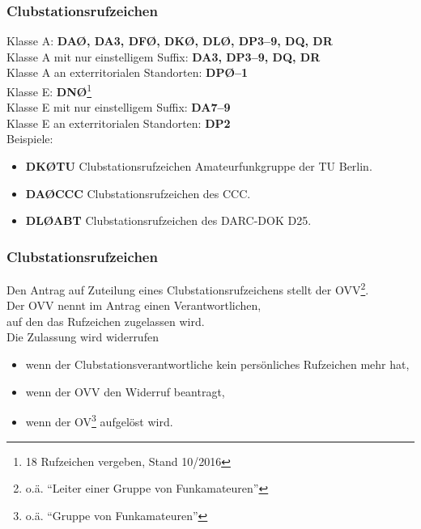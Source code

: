 \begin{frame}
  \frametitle{Clubstationsrufzeichen}

  Klasse A: \textbf{DAØ, DA3, DFØ, DKØ, DLØ, DP3--9, DQ, DR}\\ 
  Klasse A mit nur einstelligem Suffix: \textbf{DA3, DP3--9, DQ, DR}\\ 
  Klasse A an exterritorialen Standorten: \textbf{DPØ--1}\\[1em]
  Klasse E: \textbf{DNØ}\footnote{18 Rufzeichen vergeben, Stand 10/2016}\\ 
  Klasse E mit nur einstelligem Suffix: \textbf{DA7--9}\\ 
  Klasse E an exterritorialen Standorten: \textbf{DP2} \\[1em]

  Beispiele:

  \begin{itemize}
    \item \textbf{DKØTU} Clubstationsrufzeichen Amateurfunkgruppe der TU Berlin.
    \item \textbf{DAØCCC} Clubstationsrufzeichen des CCC.
    \item \textbf{DLØABT} Clubstationsrufzeichen des DARC-DOK D25.
  \end{itemize}

\end{frame}

\begin{frame}
  \frametitle{Clubstationsrufzeichen}

    Den Antrag auf Zuteilung eines Clubstationsrufzeichens stellt der OVV\footnote{o.ä. ``Leiter einer Gruppe von Funkamateuren''}.\\ 
    Der OVV nennt im Antrag einen Verantwortlichen,\\
    auf den das Rufzeichen zugelassen wird.\\ [1.5em]

  Die Zulassung wird widerrufen

  \begin{itemize}
    \item wenn der Clubstationsverantwortliche kein persönliches Rufzeichen mehr hat,
    \item wenn der OVV den Widerruf beantragt,
    \item wenn der OV\footnote{o.ä. ``Gruppe von Funkamateuren''} aufgelöst wird.\\ [1.5em]
  \end{itemize}

\end{frame}

